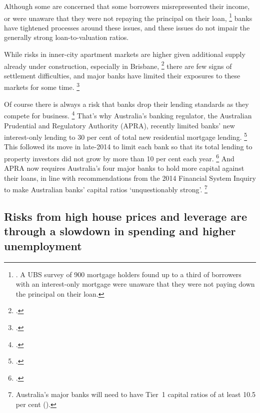 Although some are concerned that some borrowers misrepresented their income, or were unaware that they were not repaying the principal on their loan,%
	\footnote{\textcite{Letts-2017-ABC-Soaring-Syd-house-prices-to-spark-mass-migration-north}.
	A UBS survey of 900 mortgage holders found up to a third of borrowers with an interest-only mortgage were unaware that they were not paying down the principal on their loan.}
banks have tightened processes around these issues, and these issues do not impair the generally strong loan-to-valuation ratios.

While risks in inner-city apartment markets are higher given additional supply already under construction, especially in Brisbane,%
	\footcite{Kearns2017ausproperty}
there are few signs of settlement difficulties, and major banks have limited their exposures to these markets for some time.%
	\footcites{ABC-2017-ANZ-tighten-apart-lending-rules}{McCauley-2016-newscomau-NAB-blacklists-risky-suburbs}

Of course there is always a risk that banks drop their lending standards as they compete for business.%
	\footcite{Bullock-2017-Financial-stability-since-GFC}
That's why Australia's banking regulator, the Australian Prudential and Regulatory Authority (APRA), recently limited banks' new interest-only lending to 30 per cent of total new residential mortgage lending.%
	\footcite{APRA-2017-announcement-limit-interest-only-loans}
This followed its move in late-2014 to limit each bank so that its total lending to property investors did not grow by more than 10 per cent each year.%
	\footcite{APRA-2014-announcement-limit-lending-below-10pc}
And APRA now requires Australia's four major banks to hold more capital against their loans, in line with recommendations from the 2014 Financial System Inquiry to make Australian banks' capital ratios `unquestionably strong'.%
	\footnote{Australia's major banks will need to have Tier~1 capital ratios of at least 10.5 per cent (\textcites{APRA-2017-announcement-unquestionably-strong-capital-benchmarks}{APRA-2016-Insight2}{FinancialSystemsInquiry2014}).}

  
\subsection{Risks from high house prices and leverage are through a slowdown in spending and higher unemployment }\label{subsec:risks-from-high-house-prices-and-leverage-are-through-a-slowdown-in-spending-and-higher-unemployment}

